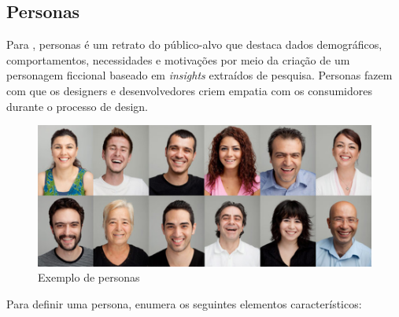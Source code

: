 \subsection{Personas}

Para , personas é  um retrato do público-alvo que destaca dados demográficos, comportamentos, necessidades e motivações por meio da criação de um personagem ficcional baseado em \textit{insights} extraídos de pesquisa. Personas fazem com que os designers e desenvolvedores criem empatia com os consumidores durante o processo de design.

\begin{figure}[H]
	\centering
	\includegraphics[scale=0.4]{imagens/personas-marketing.png}
	\caption{Exemplo de personas}
\end{figure}

Para definir uma persona,  enumera os seguintes elementos característicos:


